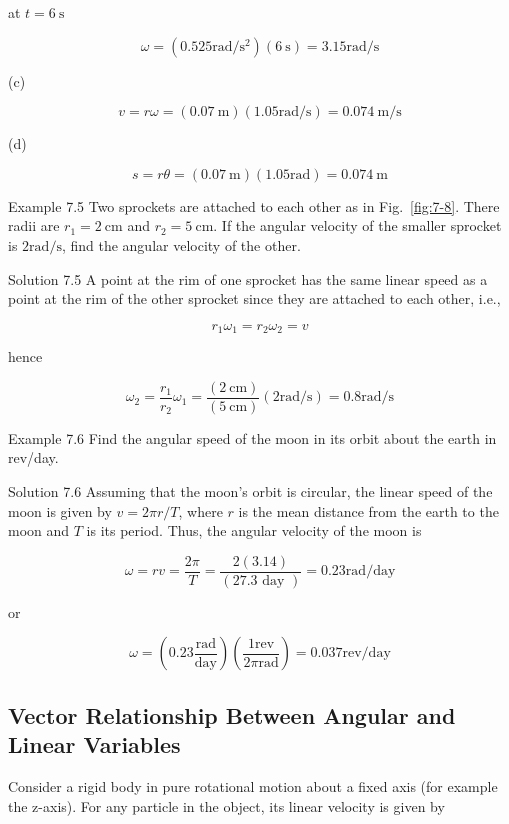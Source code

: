 \documentclass[10pt]{article}
\numberwithin{equation}{section}
\begin{document}
at $t=6 \mathrm{~s}$

$$
\omega=\left(0.525 \mathrm{rad} / \mathrm{s}^{2}\right)(6 \mathrm{~s})=3.15 \mathrm{rad} / \mathrm{s}
$$

(c)

$$
v=r \omega=(0.07 \mathrm{~m})(1.05 \mathrm{rad} / \mathrm{s})=0.074 \mathrm{~m} / \mathrm{s}
$$

(d)

$$
s=r \theta=(0.07 \mathrm{~m})(1.05 \mathrm{rad})=0.074 \mathrm{~m}
$$

Example 7.5 Two sprockets are attached to each other as in Fig.~\ref{fig:7-8}. There radii are $r_{1}=2 \mathrm{~cm}$ and $r_{2}=5 \mathrm{~cm}$. If the angular velocity of the smaller sprocket is $2 \mathrm{rad} / \mathrm{s}$, find the angular velocity of the other.

Solution 7.5 A point at the rim of one sprocket has the same linear speed as a point at the rim of the other sprocket since they are attached to each other, i.e.,

$$
r_{1} \omega_{1}=r_{2} \omega_{2}=v
$$

hence

$$
\omega_{2}=\frac{r_{1}}{r_{2}} \omega_{1}=\frac{(2 \mathrm{~cm})}{(5 \mathrm{~cm})}(2 \mathrm{rad} / \mathrm{s})=0.8 \mathrm{rad} / \mathrm{s}
$$

Example 7.6 Find the angular speed of the moon in its orbit about the earth in rev/day.

Solution 7.6 Assuming that the moon's orbit is circular, the linear speed of the moon is given by $v=2 \pi r / T$, where $r$ is the mean distance from the earth to the moon and $T$ is its period. Thus, the angular velocity of the moon is

$$
\omega=r v=\frac{2 \pi}{T}=\frac{2(3.14)}{(27.3 \text { day })}=0.23 \mathrm{rad} / \mathrm{day}
$$

or

$$
\omega=\left(0.23 \frac{\mathrm{rad}}{\mathrm{day}}\right)\left(\frac{1 \mathrm{rev}}{2 \pi \mathrm{rad}}\right)=0.037 \mathrm{rev} / \mathrm{day}
$$

\subsection{Vector Relationship Between Angular and Linear Variables}\label{sec:7-4}
Consider a rigid body in pure rotational motion about a fixed axis (for example the z-axis). For any particle in the object, its linear velocity is given by
\end{document}
